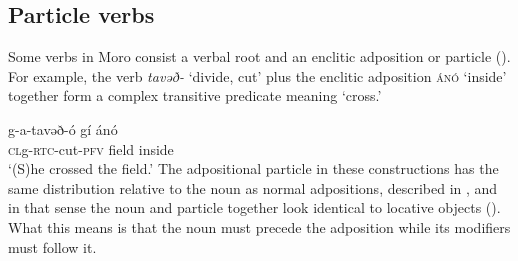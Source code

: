 %
%
%
%
%
%
%
% 
%
%


\subsection{Particle verbs}\label{sec:ch12:particle}

Some verbs in Moro consist a verbal root and an enclitic adposition or particle (). For example, the verb \textit{tavəð-} `divide, cut' plus the enclitic adposition \textsc{ánó} `inside' together form a complex transitive predicate meaning `cross.'

\ea \gll g-a-tavəð-ó gí ánó\\
 		\textsc{cl}g-\textsc{rtc-}cut-\textsc{pfv} field inside \\
	\glt ‘(S)he crossed the field.’ \label{ex:ch12:vpart1}
\z
The adpositional particle in these constructions has the same distribution relative to the noun as normal adpositions, described in , and in that sense the noun and particle together look identical to locative objects (). What this means is that the noun must precede the adposition while its modifiers must follow it. %

